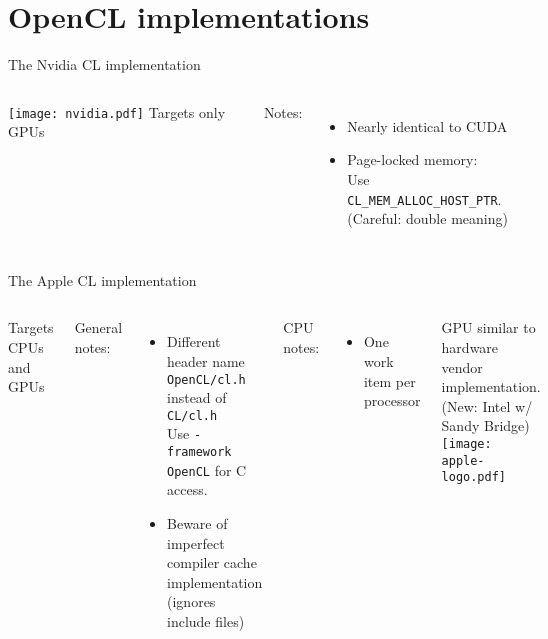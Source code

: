 \documentclass[english,compress]{beamer}
\begin{document}
\section[]{OpenCL implementations}

\begin{frame}{The Nvidia CL implementation}
  \begin{columns}
      \texttt{[image: nvidia.pdf]}
      Targets only GPUs

      \medskip
      Notes:
      \begin{itemize}
        \item Nearly identical to CUDA
        \item Page-locked memory:\\
          Use \texttt{CL\_MEM\_ALLOC\_HOST\_PTR}.\\
          (Careful: double meaning)
      \end{itemize}
  \end{columns}
\end{frame}
\begin{frame}{The Apple CL implementation}
  \begin{columns}
      Targets CPUs and GPUs

      \medskip
      General notes:
      \begin{itemize}
        \item Different header name\\
          \texttt{OpenCL/cl.h} instead of \texttt{CL/cl.h}\\
          Use \texttt{-framework OpenCL} for C access.
        \item Beware of imperfect compiler cache implementation\\
          (ignores include files)
      \end{itemize}
      CPU notes:
      \begin{itemize}
        \item One work item per processor
      \end{itemize}
      GPU similar to hardware vendor implementation.\\
      (New: Intel w/ Sandy Bridge)
      \texttt{[image: apple-logo.pdf]}
  \end{columns}
\end{frame}
\end{document}
